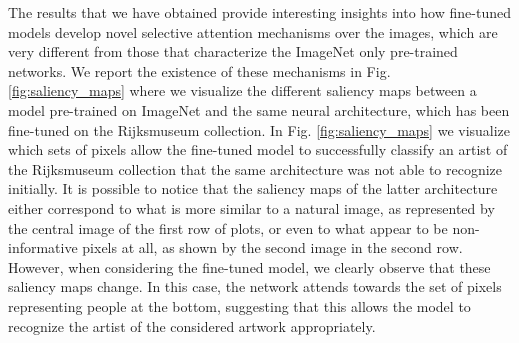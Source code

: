 The results that we have obtained provide interesting insights into how fine-tuned models develop novel selective attention mechanisms over the images, which are very different from those that characterize the ImageNet only pre-trained networks. We report the existence of these mechanisms in Fig. \ref{fig:saliency_maps} where we visualize the different saliency maps between a model pre-trained on ImageNet and the same neural architecture, which has been fine-tuned on the Rijksmuseum collection. In Fig. \ref{fig:saliency_maps} we visualize which sets of pixels allow the fine-tuned model to successfully classify an artist of the Rijksmuseum collection that the same architecture was not able to recognize initially. It is possible to notice that the saliency maps of the latter architecture either correspond to what is more similar to a natural image, as represented by the central image of the first row of plots, or even to what appear to be non-informative pixels at all, as shown by the second image in the second row. However, when considering the fine-tuned model, we clearly observe that these saliency maps change. In this case, the network attends towards the set of pixels representing people at the bottom, suggesting that this allows the model to recognize the artist of the considered artwork appropriately.

